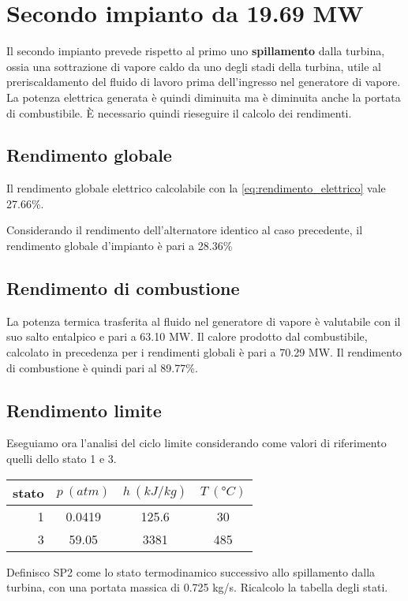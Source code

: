 \section{Secondo impianto da 19.69 MW}
Il secondo impianto prevede rispetto al primo uno \textbf{spillamento} dalla turbina, ossia una sottrazione di vapore caldo da uno degli stadi della turbina, 
utile al preriscaldamento del fluido di lavoro prima dell'ingresso nel generatore di vapore.
La potenza elettrica generata è quindi diminuita ma è diminuita anche la portata di combustibile. È necessario quindi rieseguire il calcolo dei rendimenti.
\subsection{Rendimento globale}
Il rendimento globale elettrico calcolabile con la \eqref{eq:rendimento_elettrico} vale 27.66\%.

Considerando il rendimento dell'alternatore identico al caso precedente, il rendimento globale d'impianto è pari a 28.36\%
\subsection{Rendimento di combustione}
La potenza termica trasferita al fluido nel generatore di vapore è valutabile con il suo salto entalpico e pari a 63.10 MW.
Il calore prodotto dal combustibile, calcolato in precedenza per i rendimenti globali è pari a 70.29 MW.
Il rendimento di combustione è quindi pari al 89.77\%.

\subsection{Rendimento limite}
\label{subsec:rendimento_limite_2}
Eseguiamo ora l'analisi del ciclo limite considerando come valori di riferimento quelli dello stato 1 e 3.
\begin{center}
    \begin{tabular}{r|c|c|c}
        stato    & $p\ (atm)$ & $h\ (kJ/kg)$ & $T\ (\text{°}C) $\\ \hline
        1   &        0.0419 &          125.6   &           30     \\ \hline
        3   &        59.05  &           3381   &           485
    \end{tabular}
\end{center}
Definisco SP2 come lo stato termodinamico successivo allo spillamento dalla turbina, con una portata massica di 0.725 kg/s. Ricalcolo la tabella degli stati.

